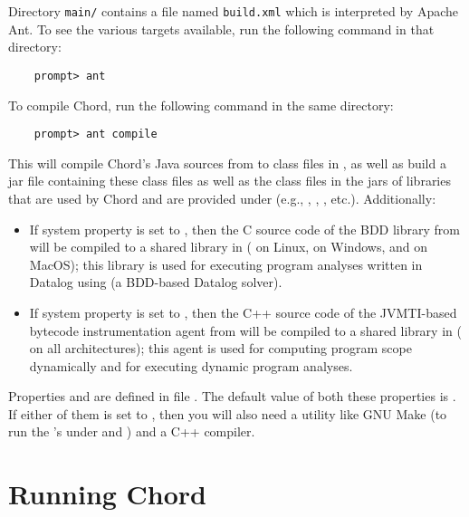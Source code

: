 Directory {\tt main/} contains a file named {\tt build.xml} which is
interpreted by Apache Ant.  To see the various targets available, run
the following command in that directory:

\begin{verbatim}
    prompt> ant
\end{verbatim}

To compile Chord, run the following command in the same directory:

\begin{verbatim}
    prompt> ant compile
\end{verbatim}

This will compile Chord's Java sources from  to class files
in , as well as build a jar file  containing
these class files as well as the class files in the jars of libraries that are used by Chord
and are provided under  (e.g., , ,
, etc.).
Additionally:
\begin{itemize}
\item
If system property  is set to ,
then the C source code of the  BDD library
from  will be compiled to a shared library in 
( on Linux,  on Windows, and
 on MacOS); this library is used for executing
program analyses written in Datalog
using  (a BDD-based Datalog solver).
\item
If system property  is set to ,
then the C++ source code of the JVMTI-based bytecode instrumentation agent from
 will be compiled to a shared library in 
( on all architectures); this agent is
used for computing program scope dynamically and for executing
dynamic program analyses.
\end{itemize}
Properties  and  are defined in file .  The
default value of both these properties is .
If either of them is set to , then you will also need a utility like GNU Make (to run the
's under  and ) and a C++ compiler.

\section{Running Chord}
\label{sec:running-chord}

